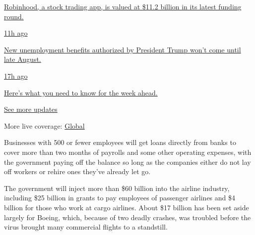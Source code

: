 \href{https://www.nytimes.com/live/2020/08/17/business/stock-market-today-coronavirus?action=click\&pgtype=Article\&state=default\&region=MAIN_CONTENT_1\&context=storylines_live_updates\#robinhood-a-stock-trading-app-is-valued-at-11-2-billion-in-its-latest-funding-round}{Robinhood,
a stock trading app, is valued at \$11.2 billion in its latest funding
round.}

\href{https://www.nytimes.com/live/2020/08/17/business/stock-market-today-coronavirus?action=click\&pgtype=Article\&state=default\&region=MAIN_CONTENT_1\&context=storylines_live_updates\#new-unemployment-benefits-authorized-by-president-trump-wont-come-until-late-august}{11h
ago}

\href{https://www.nytimes.com/live/2020/08/17/business/stock-market-today-coronavirus?action=click\&pgtype=Article\&state=default\&region=MAIN_CONTENT_1\&context=storylines_live_updates\#new-unemployment-benefits-authorized-by-president-trump-wont-come-until-late-august}{New
unemployment benefits authorized by President Trump won't come until
late August.}

\href{https://www.nytimes.com/live/2020/08/17/business/stock-market-today-coronavirus?action=click\&pgtype=Article\&state=default\&region=MAIN_CONTENT_1\&context=storylines_live_updates\#heres-what-you-need-to-know-for-the-week-ahead}{17h
ago}

\href{https://www.nytimes.com/live/2020/08/17/business/stock-market-today-coronavirus?action=click\&pgtype=Article\&state=default\&region=MAIN_CONTENT_1\&context=storylines_live_updates\#heres-what-you-need-to-know-for-the-week-ahead}{Here's
what you need to know for the week ahead.}

\href{https://www.nytimes.com/live/2020/08/17/business/stock-market-today-coronavirus?action=click\&pgtype=Article\&state=default\&region=MAIN_CONTENT_1\&context=storylines_live_updates}{See
more updates}

More live coverage:
\href{https://www.nytimes.com/2020/08/17/world/coronavirus-covid.html?action=click\&pgtype=Article\&state=default\&region=MAIN_CONTENT_1\&context=storylines_live_updates}{Global}

Businesses with 500 or fewer employees will get loans directly from
banks to cover more than two months of payrolls and some other operating
expenses, with the government paying off the balance so long as the
companies either do not lay off workers or rehire ones they've already
let go.

The government will inject more than \$60 billion into the airline
industry, including \$25 billion in grants to pay employees of passenger
airlines and \$4 billion for those who work at cargo airlines. About
\$17 billion has been set aside largely for Boeing, which, because of
two deadly crashes, was troubled before the virus brought many
commercial flights to a standstill.

